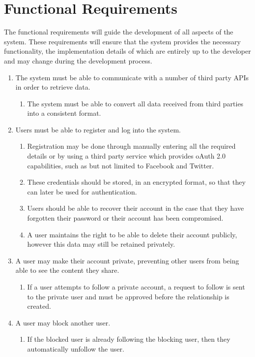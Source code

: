 \section{Functional Requirements}
The functional requirements will guide the development of all aspects of the system. These requirements will ensure that the system provides the necessary functionality, the implementation details of which are entirely up to the developer and may change during the development process.
\begin{enumerate}[label=\textbf{F\arabic*}]
	\item The system must be able to communicate with a number of third party APIs in order to retrieve data.
		\begin{enumerate}
			\item The system must be able to convert all data received from third parties into a consistent format.
		\end{enumerate}
	\item Users must be able to register and log into the system.
	\begin{enumerate}
		\item Registration may be done through manually entering all the required details or by using a third party service which provides oAuth 2.0 capabilities, such as but not limited to Facebook and Twitter.
		\item These credentials should be stored, in an encrypted format, so that they can later be used for authentication.
		\item Users should be able to recover their account in the case that they have forgotten their password or their account has been compromised.
		\item A user maintains the right to be able to delete their account publicly, however this data may still be retained privately.
	\end{enumerate}
	\item A user may make their account private, preventing other users from being able to see the content they share.
		\begin{enumerate}
			\item If a user attempts to follow a private account, a request to follow is sent to the private user and must be approved before the relationship is created.
		\end{enumerate}
	\item A user may block another user.
		\begin{enumerate}
			\item If the blocked user is already following the blocking user, then they automatically unfollow the user.

\end{enumerate}
\end{enumerate}
